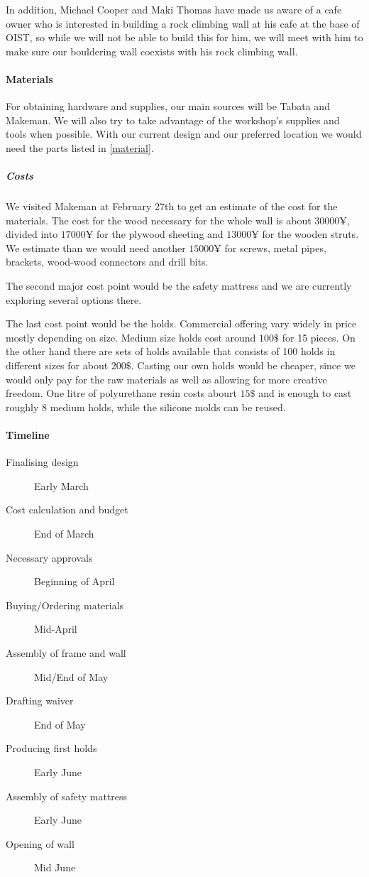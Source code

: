 \documentclass[a4paper, 12pt]{scrartcl}
\begin{document}
In addition, Michael Cooper and Maki Thomas have made us aware of a cafe owner who is interested in building a rock climbing wall at his cafe at the base of OIST, so while we will not be able to build this for him, we will meet with him to make sure our bouldering wall coexists with his rock climbing wall.

\paragraph{Materials}
For obtaining hardware and supplies, our main sources will be Tabata and Makeman. We will also try to take advantage of the workshop's supplies and tools when possible. With our current design and our preferred location we would need the parts listed in \cref{material}.

\subparagraph{Costs}
We visited Makeman at February 27th to get an estimate of the cost for the materials. The cost for the wood necessary for the whole wall is about $30000\yen$, divided into $17000\yen$ for the plywood sheeting and $13000\yen$ for the wooden struts. We estimate than we would need another $15000\yen$ for screws, metal pipes, brackets, wood-wood connectors and drill bits.

The second major cost point would be the safety mattress and we are currently exploring several options there.

The last cost point would be the holds. Commercial offering vary widely in price mostly depending on size. Medium size holds cost around $100\$$ for 15 pieces. On the other hand there are sets of holds available that consists of 100 holds in different sizes for about $200\$$. Casting our own holds would be cheaper, since we would only pay for the raw materials as well as allowing for more creative freedom. One litre of polyurethane resin costs abourt $15\$$ and is enough to cast roughly 8 medium holds, while the silicone molds can be reused.

\paragraph{Timeline}
\begin{description}
  \item[Finalising design] Early March
  \item[Cost calculation and budget] End of March
  \item[Necessary approvals] Beginning of April
  \item[Buying/Ordering materials] Mid-April
  \item[Assembly of frame and wall] Mid/End of May
  \item[Drafting waiver] End of May
  \item[Producing first holds] Early June
  \item[Assembly of safety mattress] Early June
  \item[Opening of wall] Mid June
\end{description}
\end{document}
